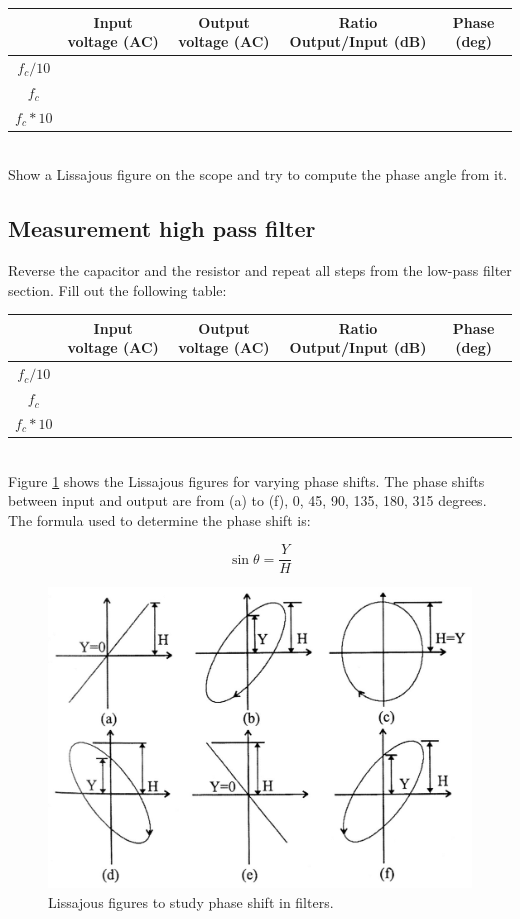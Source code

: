 \documentclass[11pt,letterpaper]{article}
\begin{document}
\begin{tabular}{|c|c|c|c|c|}
\hline  & Input voltage (AC) & Output voltage (AC) & Ratio Output/Input (dB) & Phase (deg) \\ 
\hline $f_c / 10$ &  &  &  &  \\ 
\hline $f_c $ &  &  &  &  \\ 
\hline $f_c * 10$ &  &  &  &  \\ 
\hline 
\end{tabular}\\ 

Show a Lissajous figure on the scope and try to compute the phase angle from it.

\subsection{Measurement high pass filter}

Reverse the capacitor and the resistor and repeat all steps from the low-pass filter section. Fill out the following table:\\

\begin{tabular}{|c|c|c|c|c|}
\hline  & Input voltage (AC) & Output voltage (AC) & Ratio Output/Input (dB) & Phase (deg) \\ 
\hline $f_c / 10$ &  &  &  &  \\ 
\hline $f_c $ &  &  &  &  \\ 
\hline $f_c * 10$ &  &  &  &  \\ 
\hline 
\end{tabular}\\

Figure \ref{fig:Lab4_LissajousFigures} shows the Lissajous figures for varying phase shifts. The phase shifts between input and output are from (a) to (f), 0, 45, 90, 135, 180, 315 degrees. The formula used to determine the phase shift is:

\begin{equation} \label{Eqn:PassiveFilters3}
\sin \theta = \dfrac{Y}{H}
\end{equation}
 
\begin{figure}
\centering
\includegraphics[width=0.7\linewidth]{Lab4_LissajousFigures}
\caption{Lissajous figures to study phase shift in filters.}
\label{fig:Lab4_LissajousFigures}
\end{figure}
 
\end{document}
